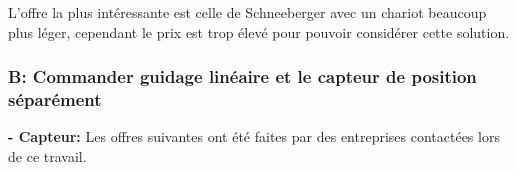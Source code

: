 \begin{table}[H]
  \centering
  \caption{Offres pour le guidage linéaire avec mesure de position}
  \label{tab:OffreGuidPos}
\end{table}

L'offre la plus intéressante est celle de Schneeberger avec un chariot beaucoup plus léger, cependant le prix est trop élevé pour pouvoir considérer cette solution.

\subsubsection{B: Commander guidage linéaire et le capteur de position séparément}
\textbf{ - Capteur:}
\newline
Les offres suivantes ont été faites par des entreprises contactées lors de ce travail.

\begin{table}[H]
  \centering
  \caption{Offres pour le capteur pour la mesure de position}
  \label{tab:OffrePos}
\end{table}

